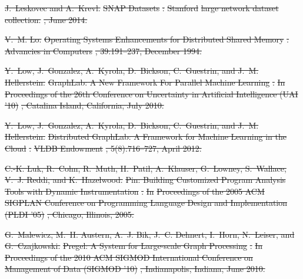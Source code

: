 \documentclass[sigconf]{acmart}
\renewcommand{\em}{\it}
\providecommand{\DIFdel}[1]{{\protect\color{red}\sout{#1}}}                      %
\begin{document}
{%
\DIFdel{J.~Leskovec and A.~Krevl.
}%
\DIFdel{SNAP Datasets}%
\DIFdel{: }%
\DIFdel{Stanford}%
\DIFdel{large network dataset collection.
}%
\DIFdel{, June 2014.
}%

\DIFdel{V.~M. Lo.
}%
\DIFdel{Operating Systems Enhancements for Distributed Shared Memory}%
\DIFdel{.
}%
\DIFdel{Advancies in Computers}%
\DIFdel{, 39:191–237, December 1994.
}%

\DIFdel{Y.~Low, J.~Gonzalez, A.~Kyrola, D.~Bickson, C.~Guestrin, and J.~M. Hellerstein.
}%
\DIFdel{GraphLab: A New Framework For Parallel Machine Learning}%
\DIFdel{.
}%
\DIFdel{In }%
\DIFdel{Proceedings of the 26th Conference on Uncertainty in
  Artificial Intelligence (UAI ’10)}%
\DIFdel{, Catalina Island, California, July 2010.
}%

\DIFdel{Y.~Low, J.~Gonzalez, A.~Kyrola, D.~Bickson, C.~Guestrin, and J.~M. Hellerstein.
}%
\DIFdel{Distributed GraphLab: A Framework for Machine Learning in the
  Cloud}%
\DIFdel{.
}%
\DIFdel{VLDB Endowment}%
\DIFdel{, 5(8):716–727, April 2012.
}%

\DIFdel{C.-K. Luk, R.~Cohn, R.~Muth, H.~Patil, A.~Klauser, G.~Lowney, S.~Wallace, V.~J.
  Reddi, and K.~Hazelwood.
}%
\DIFdel{Pin: Building Customized Program Analysis Tools with Dynamic
  Instrumentation}%
\DIFdel{.
}%
\DIFdel{In }%
\DIFdel{Proceedings of the 2005 ACM SIGPLAN Conference on Programming
  Language Design and Implementation (PLDI '05)}%
\DIFdel{, Chicago, Illinois, 2005.
}%

\DIFdel{G.~Malewicz, M.~H. Austern, A.~J. Bik, J.~C. Dehnert, I.~Horn, N.~Leiser, and
  G.~Czajkowski.
}%
\DIFdel{Pregel: A System for Large-scale Graph Processing}%
\DIFdel{.
}%
\DIFdel{In }%
\DIFdel{Proceedings of the 2010 ACM SIGMOD International Conference
  on Management of Data (SIGMOD ’10)}%
\DIFdel{, Indianapolis, Indiana, June 2010.
}%

}
\end{document}
